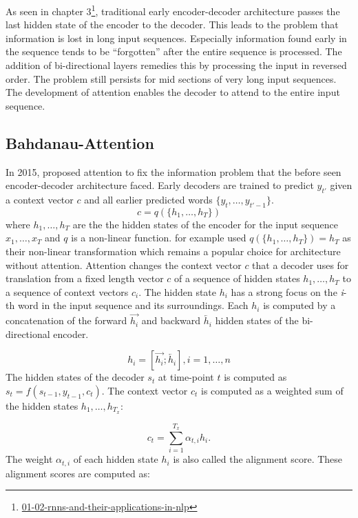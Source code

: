 \documentclass[]{krantz}
\renewcommand{\href}[2]{#2\footnote{\url{#1}}}
\begin{document}
As seen in chapter \href{01-02-rnns-and-their-applications-in-nlp}{3}, traditional early
encoder-decoder architecture passes the last hidden state of the encoder to the decoder.
This leads to the problem that information is lost in long input sequences.
Especially information found early in the sequence tends to be ``forgotten'' after
the entire sequence is processed. The addition of bi-directional layers remedies
this by processing the input in reversed order. The problem still persists for mid
sections of very long input sequences. The development of attention enables the decoder to
attend to the entire input sequence.

\hypertarget{bahdanau-attention}{%
\subsection{Bahdanau-Attention}\label{bahdanau-attention}}

In 2015, \citet{bahdanau2014neural} proposed attention to fix the information problem that
the before seen encoder-decoder architecture faced. Early decoders are trained to predict \(y_{t'}\)
given a context vector \(c\) and all earlier predicted words \(\{y_t, \dots, y_{t'-1}\}\).
\[c=q(\{h_1,\dots,h_T\})\] where \(h_1,\dots,h_T\) are the the hidden states of the encoder for the input sequence
\(x_1,\dots, x_T\) and \(q\) is a non-linear function. \citet{sutskever2014sequence} for example used
\(q(\{h_1,\dots,h_T\}) = h_T\) as their non-linear transformation which remains a popular
choice for architecture without attention.
Attention changes the context vector \(c\) that a decoder uses for translation from a fixed
length vector \(c\) of a sequence of hidden states \(h_1, \dots, h_T\) to a sequence
of context vectors \(c_i\). The hidden state \(h_i\) has a strong focus on the \emph{i}-th
word in the input sequence and its surroundings.
Each \(h_i\) is computed by a concatenation of the forward
\(\overrightarrow{h_i}\) and backward \(\overleftarrow{h_i}\) hidden states of the
bi-directional encoder.

\[
h_i = [\overrightarrow{h_i}; \overleftarrow{h_i}], i = 1,\dots,n
\]
The hidden states of the decoder \(s_t\) at time-point \(t\) is computed as \(s_t = f(s_{t-1},y_{t-1},c_t)\).
The context vector \(c_t\) is computed as a weighted sum of the hidden
states \(h_1,\dots, h_{T_x}\):

\[
c_t = \sum^{T_x}_{i=1}\alpha_{t,i}h_i.
\]
The weight \(\alpha_{t,i}\) of each hidden state \(h_i\) is also called the alignment score.
These alignment scores are computed as:
\end{document}
